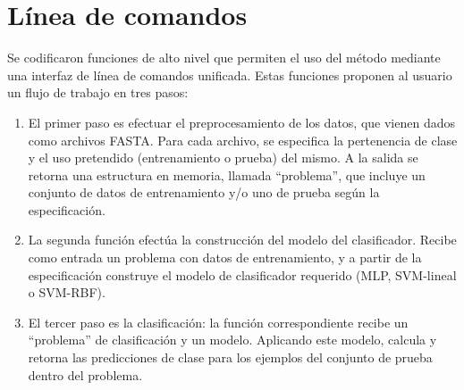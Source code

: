 %
%
%
\section{Línea de comandos}
%
Se codificaron funciones de alto nivel que permiten el uso del método
mediante una interfaz de línea de comandos unificada.
Estas funciones proponen al usuario un flujo de trabajo en tres pasos:
%
\begin{enumerate}
\item
  El primer paso es efectuar el preprocesamiento de los datos, que
  vienen dados como archivos FASTA.
  Para cada archivo, se especifica la pertenencia de clase y el uso
  pretendido (entrenamiento o prueba) del mismo.
  A la salida se retorna una estructura en memoria, llamada
  ``problema'', que incluye un conjunto de datos de entrenamiento y/o
  uno de prueba según la especificación.
\item
  La segunda función efectúa la construcción del modelo del
  clasificador.
  Recibe como entrada un problema con datos de entrenamiento, y a
  partir de la especificación construye el modelo de clasificador
  requerido (MLP, SVM-lineal o SVM-RBF).
\item
  El tercer paso es la clasificación: la función correspondiente
  recibe un ``problema'' de clasificación y un modelo.
  Aplicando este modelo, calcula y retorna las predicciones de clase
  para los ejemplos del conjunto de prueba dentro del problema.
\end{enumerate}
%
